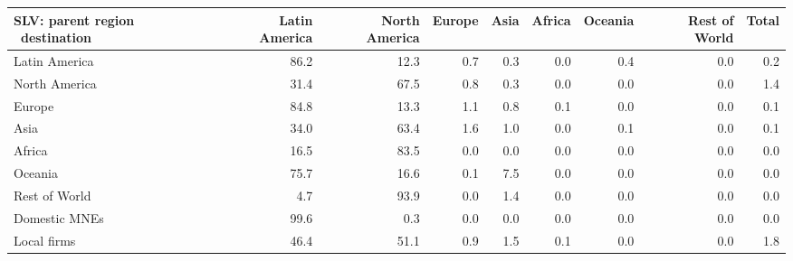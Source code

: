 \begin{tabular}{lrrrrrrrr}
\toprule
SLV: parent region \ destination & Latin America & North America & Europe & Asia & Africa & Oceania & Rest of World & Total \\
\midrule
Latin America & 86.2 & 12.3 & 0.7 & 0.3 & 0.0 & 0.4 & 0.0 & 0.2 \\
North America & 31.4 & 67.5 & 0.8 & 0.3 & 0.0 & 0.0 & 0.0 & 1.4 \\
Europe & 84.8 & 13.3 & 1.1 & 0.8 & 0.1 & 0.0 & 0.0 & 0.1 \\
Asia & 34.0 & 63.4 & 1.6 & 1.0 & 0.0 & 0.1 & 0.0 & 0.1 \\
Africa & 16.5 & 83.5 & 0.0 & 0.0 & 0.0 & 0.0 & 0.0 & 0.0 \\
Oceania & 75.7 & 16.6 & 0.1 & 7.5 & 0.0 & 0.0 & 0.0 & 0.0 \\
Rest of World & 4.7 & 93.9 & 0.0 & 1.4 & 0.0 & 0.0 & 0.0 & 0.0 \\
Domestic MNEs & 99.6 & 0.3 & 0.0 & 0.0 & 0.0 & 0.0 & 0.0 & 0.0 \\
Local firms & 46.4 & 51.1 & 0.9 & 1.5 & 0.1 & 0.0 & 0.0 & 1.8 \\
\bottomrule
\end{tabular}
